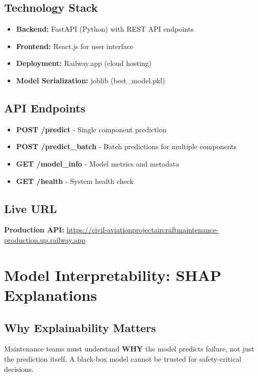 \documentclass[11pt,a4paper]{article}
\begin{document}
\subsection{Technology Stack}
\begin{itemize}
    \item \textbf{Backend:} FastAPI (Python) with REST API endpoints
    \item \textbf{Frontend:} React.js for user interface
    \item \textbf{Deployment:} Railway.app (cloud hosting)
    \item \textbf{Model Serialization:} joblib (best\_model.pkl)
\end{itemize}

\subsection{API Endpoints}
\begin{itemize}
    \item \textbf{POST /predict} - Single component prediction
    \item \textbf{POST /predict\_batch} - Batch predictions for multiple components
    \item \textbf{GET /model\_info} - Model metrics and metadata
    \item \textbf{GET /health} - System health check
\end{itemize}

\subsection{Live URL}
\textbf{Production API:} \url{https://civil-aviationprojectaircraftmaintenance-production.up.railway.app}

\section{Model Interpretability: SHAP Explanations}

\subsection{Why Explainability Matters}

Maintenance teams must understand \textbf{WHY} the model predicts failure, not just the prediction itself. A black-box model cannot be trusted for safety-critical decisions.
\end{document}
